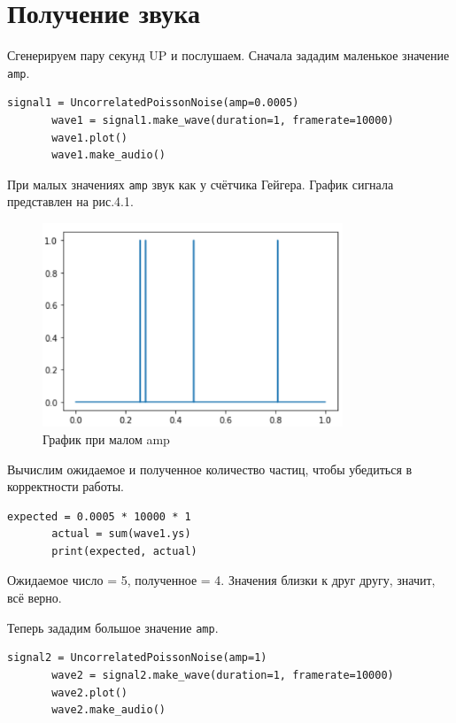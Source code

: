\documentclass[a4paper,12pt]{report}
\begin{document}
\section{Получение звука}
    Сгенерируем пару секунд UP и послушаем. Сначала зададим маленькое значение \texttt{amp}.
\begin{lstlisting}[caption=Получение звука при малых значениях amp]
       signal1 = UncorrelatedPoissonNoise(amp=0.0005)
       wave1 = signal1.make_wave(duration=1, framerate=10000)
       wave1.plot()
       wave1.make_audio()
\end{lstlisting}
    
    При малых значениях \texttt{amp} звук как у счётчика Гейгера. График сигнала представлен на рис.4.1.
\begin{figure}[H]
        \centering
        \includegraphics[width=0.8\textwidth]{fig4-1.PNG}
        \caption{График при малом amp}
        \label{fig:fig4-1}
\end{figure}
    
    Вычислим ожидаемое и полученное количество частиц, чтобы убедиться в корректности работы.
\begin{lstlisting}[caption=Число частиц при малых значениях amp]
       expected = 0.0005 * 10000 * 1
       actual = sum(wave1.ys)
       print(expected, actual)
\end{lstlisting} 

    Ожидаемое число = 5, полученное = 4. Значения близки к друг другу, значит, всё верно.
    
    Теперь зададим большое значение \texttt{amp}.       
\begin{lstlisting}[caption=Получение звука при больших значениях amp]
       signal2 = UncorrelatedPoissonNoise(amp=1)
       wave2 = signal2.make_wave(duration=1, framerate=10000)
       wave2.plot()
       wave2.make_audio()
\end{lstlisting}  
\end{document}
